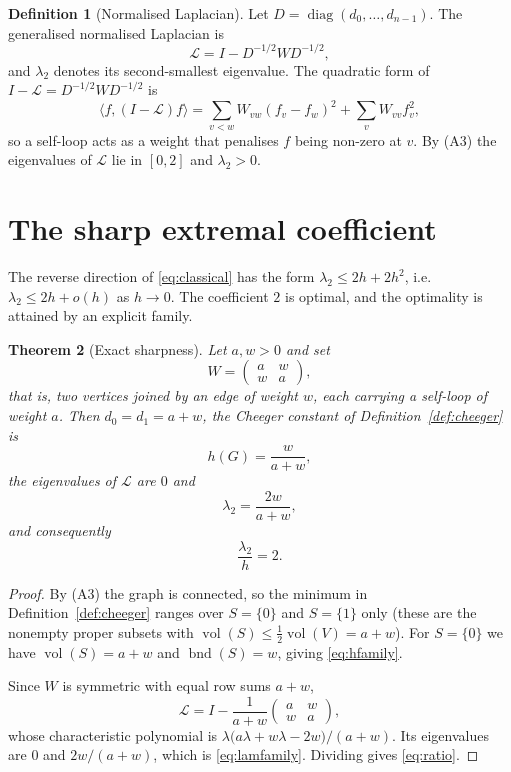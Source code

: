 \documentclass[11pt,a4paper]{article}
\theoremstyle{plain}
\newtheorem{theorem}{Theorem}[section]
\theoremstyle{definition}
\newtheorem{definition}[theorem]{Definition}
\DeclareMathOperator{\vol}{vol}
\DeclareMathOperator{\bnd}{bnd}
\begin{document}
\begin{definition}[Normalised Laplacian]\label{def:laplacian}
Let $D=\operatorname{diag}(d_0,\dots,d_{n-1})$.  The generalised normalised
Laplacian is
\[
  \mathcal{L}=I-D^{-1/2}WD^{-1/2},
\]
and $\lambda_2$ denotes its second-smallest eigenvalue.  The quadratic form of
$I-\mathcal{L}=D^{-1/2}WD^{-1/2}$ is
\[
  \langle f,(I-\mathcal{L})f\rangle
   =\sum_{v<w}W_{vw}(f_v-f_w)^2+\sum_{v}W_{vv}f_v^2 ,
\]
so a self-loop acts as a weight that penalises $f$ being non-zero at $v$.  By
(A3) the eigenvalues of $\mathcal{L}$ lie in $[0,2]$ and $\lambda_2>0$.
\end{definition}

\section{The sharp extremal coefficient}\label{sec:sharp}

The reverse direction of \eqref{eq:classical} has the form
$\lambda_2\le 2h+2h^2$, i.e.\ $\lambda_2\le 2h+o(h)$ as $h\to 0$.  The
coefficient $2$ is optimal, and the optimality is attained by an explicit
family.

\begin{theorem}[Exact sharpness]\label{thm:sharp}
Let $a,w>0$ and set
\[
  W=\begin{pmatrix} a & w\\ w & a\end{pmatrix},
\]
that is, two vertices joined by an edge of weight $w$, each carrying a
self-loop of weight $a$.  Then $d_0=d_1=a+w$, the Cheeger constant of
Definition~\ref{def:cheeger} is
\begin{equation}\label{eq:hfamily}
  h(G)=\frac{w}{a+w},
\end{equation}
the eigenvalues of $\mathcal{L}$ are $0$ and
\begin{equation}\label{eq:lamfamily}
  \lambda_2=\frac{2w}{a+w},
\end{equation}
and consequently
\begin{equation}\label{eq:ratio}
  \frac{\lambda_2}{h}=2 .
\end{equation}
\end{theorem}

\begin{proof}
By (A3) the graph is connected, so the minimum in Definition~\ref{def:cheeger}
ranges over $S=\{0\}$ and $S=\{1\}$ only (these are the nonempty proper
subsets with $\vol(S)\le \frac12\vol(V)=a+w$).  For $S=\{0\}$ we have
$\vol(S)=a+w$ and $\bnd(S)=w$, giving \eqref{eq:hfamily}.

Since $W$ is symmetric with equal row sums $a+w$,
\[
  \mathcal{L}=I-\frac{1}{a+w}\begin{pmatrix}a&w\\w&a\end{pmatrix},
\]
whose characteristic polynomial is
$\lambda\bigl(a\lambda+w\lambda-2w\bigr)/(a+w)$.  Its eigenvalues are $0$ and
$2w/(a+w)$, which is \eqref{eq:lamfamily}.  Dividing gives \eqref{eq:ratio}.
\end{proof}
\end{document}
